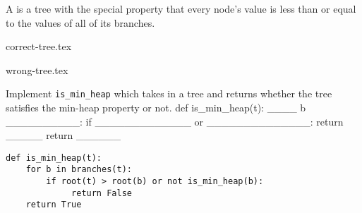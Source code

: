 \begin{blocksection}
\question A  is a tree with the special property that every node's value is
less than or equal to the values of all of its branches.

\vspace{\parskip}
\begin{minipage}{0.5\linewidth}
\centering
{correct-tree.tex}
\end{minipage}
\begin{minipage}{0.5\linewidth}
\centering
{wrong-tree.tex}
\end{minipage}
\vspace{\parskip}

Implement \lstinline$is_min_heap$ which takes in a tree and returns whether the tree satisfies
the min-heap property or not.
def is_min_heap(t):
    ____ b __________:
        if _____________ or ______________:
             return _____
    return ______

\begin{solution}[1.5in]
\begin{lstlisting}
def is_min_heap(t):
    for b in branches(t):
        if root(t) > root(b) or not is_min_heap(b):
             return False
    return True
\end{lstlisting}
\end{solution}
\end{blocksection}
